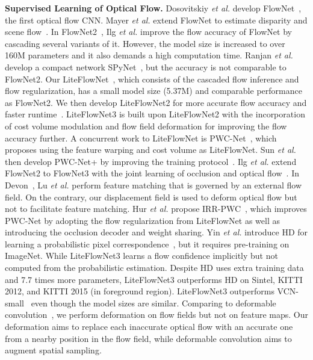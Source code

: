 \documentclass[runningheads]{llncs}
\newcommand{\etal}{\emph{et al. }}
\begin{document}
\noindent \textbf{Supervised Learning of Optical Flow.} Dosovitskiy \etal develop FlowNet~\cite{Dosovitskiy15}, the first optical flow CNN. 
Mayer \etal extend FlowNet to estimate disparity and scene flow~\cite{Mayer16}.
In FlowNet2~\cite{Ilg17}, Ilg \etal improve the flow accuracy of FlowNet by cascading several variants of it. However, the model size is increased to over 160M parameters and it also demands a high computation time. 
Ranjan \etal develop a compact network SPyNet~\cite{Ranjan17}, but the accuracy is not comparable to FlowNet2. 
Our LiteFlowNet~\cite{Hui18}, which consists of the cascaded flow inference and flow regularization, has a small model size (5.37M) and comparable performance as FlowNet2. We then develop LiteFlowNet2 for more accurate flow accuracy and faster runtime~\cite{Hui20}. LiteFlowNet3 is built upon LiteFlowNet2 with the incorporation of cost volume modulation and flow field deformation for improving the flow accuracy further.
A concurrent work to LiteFlowNet is PWC-Net~\cite{Sun18}, which proposes using the feature warping and cost volume as LiteFlowNet. Sun \etal then develop PWC-Net+ by improving the training protocol~\cite{Sun19}. 
Ilg \etal extend FlowNet2 to FlowNet3 with the joint learning of occlusion and optical flow~\cite{Ilg18}. 
In Devon~\cite{Lu20}, Lu \etal perform feature matching that is governed by an external flow field. On the contrary, our displacement field is used to deform optical flow but not to facilitate feature matching.
Hur \etal propose IRR-PWC~\cite{Hur19}, which improves PWC-Net by adopting the flow regularization from LiteFlowNet as well as introducing the occlusion decoder and weight sharing. 
Yin \etal introduce HD for learning a probabilistic pixel correspondence~\cite{Yin19}, but it requires pre-training on ImageNet. While LiteFlowNet3 learns a flow confidence implicitly but not computed from the probabilistic estimation. Despite HD uses extra training data and 7.7 times more parameters, LiteFlowNet3 outperforms HD on Sintel, KITTI 2012, and KITTI 2015 (in foreground region).
LiteFlowNet3 outperforms VCN-small~\cite{Yang19} even though the model sizes are similar.
Comparing to deformable convolution~\cite{Dai17}, we perform deformation on flow fields but not on feature maps. Our deformation aims to replace each inaccurate optical flow with an accurate one from a nearby position in the flow field, while deformable convolution aims to augment spatial sampling.
\end{document}
